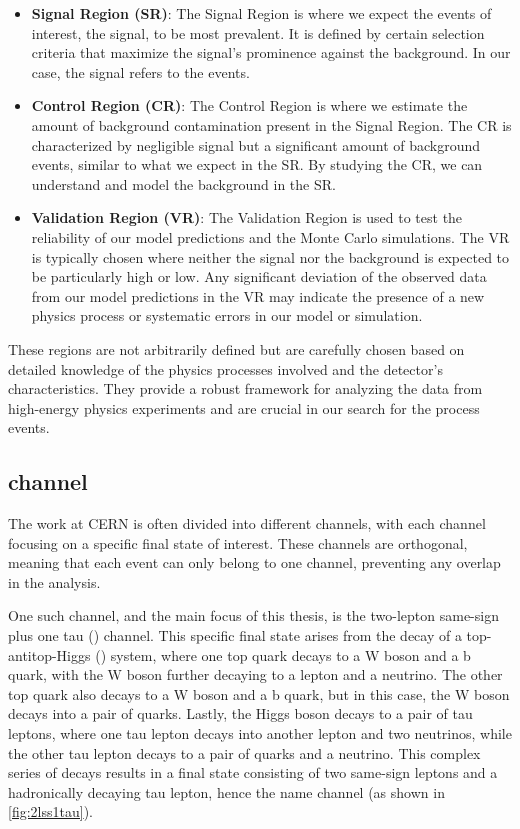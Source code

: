 \begin{itemize}
    \item \textbf{Signal Region (SR)}: The Signal Region is where we expect the events of interest, the
          signal, to be most prevalent. It is defined by certain selection criteria that maximize the signal's prominence against
          the background. In our case, the signal refers to the \tth events.

    \item \textbf{Control Region (CR)}: The Control Region is where we estimate the amount of background contamination
          present in the Signal Region. The CR is characterized by negligible signal but a significant amount of background
          events, similar to what we expect in the SR. By studying the CR, we can understand and model the background in the SR.

    \item \textbf{Validation Region (VR)}: The Validation Region is used to test the reliability of our model predictions
          and the Monte Carlo simulations. The VR is typically chosen where neither the signal nor the background is expected to
          be particularly high or low. Any significant deviation of the observed data from our model predictions in the VR may
          indicate the presence of a new physics process or systematic errors in our model or simulation.  \end{itemize}

These regions are not arbitrarily defined but are carefully chosen based on detailed knowledge of the physics processes
involved and the detector's characteristics. They provide a robust framework for analyzing the data from high-energy
physics experiments and are crucial in our search for the \tth process events.

\subsection{\lss channel}



The work at CERN is often divided into different channels, with each channel focusing on a specific final state of
interest. These channels are orthogonal, meaning that each event can only belong to one channel, preventing any overlap
in the analysis.

One such channel, and the main focus of this thesis, is the two-lepton same-sign plus one tau (\lss) channel. This
specific final state arises from the decay of a top-antitop-Higgs (\tth) system, where one top quark decays to a W boson
and a b quark, with the W boson further decaying to a lepton and a neutrino. The other top quark also decays to a W
boson and a b quark, but in this case, the W boson decays into a pair of quarks. Lastly, the Higgs boson decays to a
pair of tau leptons, where one tau lepton decays into another lepton and two neutrinos, while the other tau lepton
decays to a pair of quarks and a neutrino. This complex series of decays results in a final state consisting of two
same-sign leptons and a hadronically decaying tau lepton, hence the name \lss channel (as shown in \autoref{fig:2lss1tau}).

